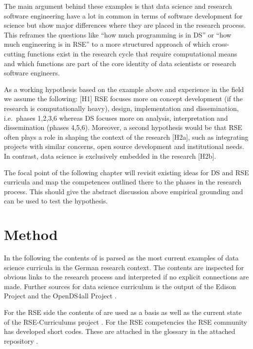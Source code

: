 \documentclass[
        english,biblatex
    ]{lni}
\begin{document}
    The main argument behind these examples is that data science and
    research software engineering have a lot in common in terms of
    software development for science but show major differences where
    they are placed in the research process. This reframes the questions
    like ``how much programming is in DS'' or ``how much engineering is
    in RSE'' to a more structured approach of which cross-cutting
    functions exist in the research cycle that require computational
    means and which functions are part of the core identity of data
    scientists or research software engineers.

    As a working hypothesis based on the example above and experience in
    the field we assume the following: {[}H1{]} RSE focuses more on
    concept development (if the research is computationally heavy),
    design, implementation and dissemination, i.e.~phases 1,2,3,6
    whereas DS focuses more on analysis, interpretation and
    dissemination (phases 4,5,6). Moreover, a second hypothesis would be
    that RSE often plays a role in shaping the context of the research
    {[}H2a{]}, such as integrating projects with similar concerns, open
    source development and institutional needs. In contrast, data
    science is exclusively embedded in the research {[}H2b{]}.

    The focal point of the following chapter will revisit existing ideas
    for DS and RSE curricula and map the competences outlined there to
    the phases in the research process. This should give the abstract
    discussion above empirical grounding and can be used to test the
    hypothesis.

    \section{Method}\label{method}

    In the following the contents of \autocite{GI2021DataScience} is
    parsed as the most current examples of data science curricula in the
    German research context. The contents are inspected for obvious
    links to the research process and interpreted if no explicit
    connections are made. Further sources for data science curriculum is
    the output of the Edison Project \autocite{EDSF2017} and the
    OpenDS4all Project \autocite{OpenDS4All2020}.

    For the RSE side the contents of \autocite{Goth2024RSE} are used as
    a basis as well as the current state of the RSE-Curriculums project
    \autocite{RSECurriculums2021}. For the RSE competencies the RSE
    community has developed short codes. These are attached in the
    glossary in the attached repository \autocite{ds2rse2025}.
\end{document}
